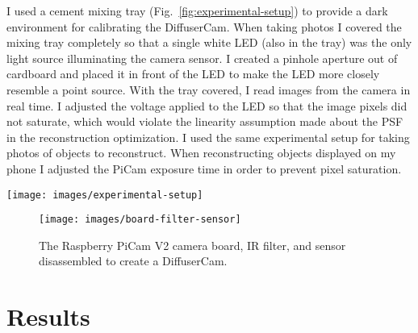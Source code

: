 \documentclass[final]{cvpr}
\begin{document}
I used a cement mixing tray (Fig.~\ref{fig:experimental-setup}) to provide
a dark environment for calibrating the DiffuserCam.
When taking photos I covered the mixing tray completely so that a single white
LED (also in the tray) was the only light source illuminating the camera
sensor.
I created a pinhole aperture out of cardboard and placed it in front of the LED
to make the LED more closely resemble a point source.
With the tray covered, I read images from the camera in real time.
I adjusted the voltage applied to the LED so that the image pixels did not
saturate, which would violate the linearity assumption made about the PSF in
the reconstruction optimization.
I used the same experimental setup for taking photos of objects to reconstruct.
When reconstructing objects displayed on my phone I adjusted the PiCam exposure
time in order to prevent pixel saturation.


\begin{figure*}[t]
	\centering
	\texttt{[image: images/experimental-setup]}
	\caption{\label{fig:experimental-setup}
		The experimental setup used to conduct calibration and collect images.
		I used the power supply (bottom) to adjust the brightness of the LED in order to prevent image saturation.}

\end{figure*}



\begin{figure}[t]
	\centering
	\texttt{[image: images/board-filter-sensor]}
	\caption{\label{fig:board-filter-sensor}
		The Raspberry PiCam V2 camera board, IR filter, and sensor disassembled to create a DiffuserCam.}
\end{figure}



\section{Results}
\end{document}
